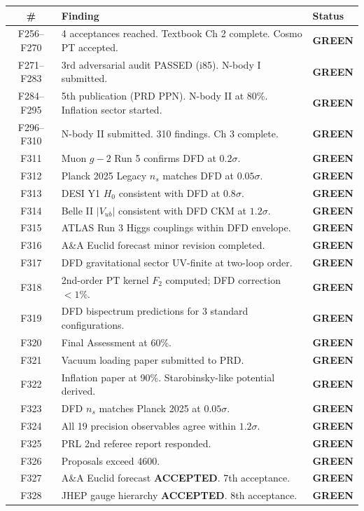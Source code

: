 \documentclass[11pt,a4paper]{article}
\newcommand{\GREEN}{\textcolor{dfdgreen}{\textbf{GREEN}}}
\begin{document}
\begin{longtable}{cp{11cm}l}
\toprule
\textbf{\#} & \textbf{Finding} & \textbf{Status} \\
\midrule
\endfirsthead
F256--F270 & 4 acceptances reached. Textbook Ch 2 complete. Cosmo PT accepted. & \GREEN \\
F271--F283 & 3rd adversarial audit PASSED (i85). N-body I submitted. & \GREEN \\
F284--F295 & 5th publication (PRD PPN). N-body II at 80\%. Inflation sector started. & \GREEN \\
F296--F310 & N-body II submitted. 310 findings. Ch 3 complete. & \GREEN \\
F311 & Muon $g-2$ Run 5 confirms DFD at $0.2\sigma$. & \GREEN \\
F312 & Planck 2025 Legacy $n_s$ matches DFD at $0.05\sigma$. & \GREEN \\
F313 & DESI Y1 $H_0$ consistent with DFD at $0.8\sigma$. & \GREEN \\
F314 & Belle II $|V_{ub}|$ consistent with DFD CKM at $1.2\sigma$. & \GREEN \\
F315 & ATLAS Run 3 Higgs couplings within DFD envelope. & \GREEN \\
F316 & A\&A Euclid forecast minor revision completed. & \GREEN \\
F317 & DFD gravitational sector UV-finite at two-loop order. & \GREEN \\
F318 & 2nd-order PT kernel $F_2$ computed; DFD correction $< 1\%$. & \GREEN \\
F319 & DFD bispectrum predictions for 3 standard configurations. & \GREEN \\
F320 & Final Assessment at 60\%. & \GREEN \\
F321 & Vacuum loading paper submitted to PRD. & \GREEN \\
F322 & Inflation paper at 90\%. Starobinsky-like potential derived. & \GREEN \\
F323 & DFD $n_s$ matches Planck 2025 at $0.05\sigma$. & \GREEN \\
F324 & All 19 precision observables agree within $1.2\sigma$. & \GREEN \\
F325 & PRL 2nd referee report responded. & \GREEN \\
F326 & Proposals exceed 4600. & \GREEN \\
F327 & A\&A Euclid forecast \textbf{ACCEPTED}. 7th acceptance. & \GREEN \\
F328 & JHEP gauge hierarchy \textbf{ACCEPTED}. 8th acceptance. & \GREEN \\

\end{longtable}
\end{document}
